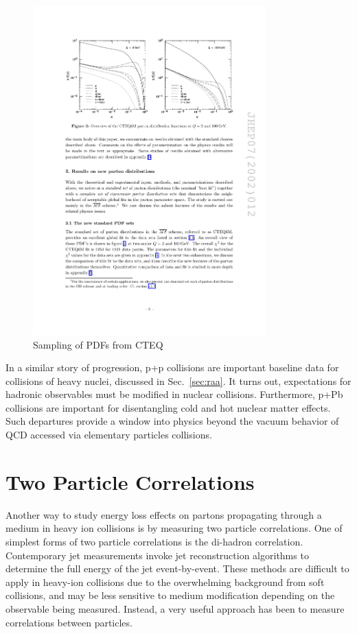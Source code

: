   \begin{figure}[htpb]
    \centering
    \includegraphics[width=0.8\textwidth]{Introduction/pdfs.pdf}
    \caption{Sampling of PDFs from CTEQ \cite{Pumplin2002}}
    \label{fig:dis_pdfs}
  \end{figure}

In a similar story of progression, p+p collisions are important baseline data for collisions of heavy nuclei, discussed in Sec.~\ref{sec:raa}. It turns out, expectations for hadronic observables must be modified in nuclear collisions. Furthermore, p+Pb collisions are important for disentangling cold and hot nuclear matter effects. Such departures provide a window into physics beyond the vacuum behavior of QCD accessed via elementary particles collisions. 




\section{Two Particle Correlations}
Another way to study energy loss effects on partons propagating through a medium in heavy ion collisions is by measuring two particle correlations. One of simplest forms of two particle correlations is the di-hadron correlation. Contemporary jet measurements invoke jet reconstruction algorithms to determine the full energy of the jet event-by-event. These methods are difficult to apply in heavy-ion collisions due to the overwhelming background from soft collisions, and may be less sensitive to medium modification depending on the observable being measured. Instead, a very useful approach has been to measure correlations between particles.

